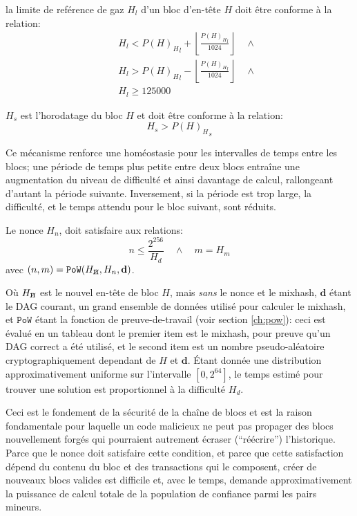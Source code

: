 \documentclass[9pt,oneside]{amsart}
\newcommand{\hcancel}[1]{%
    \tikz[baseline=(tocancel.base)]{
        \node[inner sep=0pt,outer sep=0pt] (tocancel) {#1};
        \draw[black] (tocancel.south west) -- (tocancel.north east);
    }%
}%
\begin{document}
\begin{multicols}{2}
la limite de reférence de gaz $H_l$ d'un bloc d'en-tête $H$ doit être conforme à la relation:
\begin{eqnarray}
& & H_l < {P(H)_H}_l + \left\lfloor\frac{{P(H)_H}_l}{1024}\right\rfloor \quad \wedge \\
& & H_l > {P(H)_H}_l - \left\lfloor\frac{{P(H)_H}_l}{1024}\right\rfloor \quad \wedge \\
& & H_l \geqslant 125000
\end{eqnarray}

$H_s$ est l'horodatage du bloc $H$ et doit être conforme à la relation:
\begin{equation}
H_s > {P(H)_H}_s
\end{equation}

Ce mécanisme renforce une homéostasie pour les intervalles de temps entre les blocs; une période de temps plus petite entre deux blocs entraîne une augmentation du niveau de difficulté et ainsi davantage de calcul, rallongeant d'autant la période suivante. Inversement, si la période est trop large, la difficulté, et le temps attendu pour le bloc suivant, sont réduits.

Le nonce $H_n$, doit satisfaire aux relations:
\begin{equation}
n \leqslant \frac{2^{256}}{H_d} \quad \wedge \quad m = H_m
\end{equation}
avec $(n, m) = \mathtt{PoW}(H_{\hcancel{n}}, H_n, \mathbf{d})$.

Où $H_{\hcancel{n}}$ est le nouvel en-tête de bloc $H$, mais \textit{sans} le nonce et le mixhash, $\mathbf{d}$ étant le DAG courant, un grand ensemble de données utilisé pour calculer le mixhash, et $\mathtt{PoW}$ étant la fonction de preuve-de-travail (voir section \ref{ch:pow}): ceci est évalué en un tableau dont le premier item est le mixhash, pour preuve qu'un DAG correct a été utilisé, et le second item est un nombre pseudo-aléatoire cryptographiquement dependant de $H$ et $\mathbf{d}$. Étant donnée une distribution approximativement uniforme sur l'intervalle $[0, 2^{64}]$, le temps estimé pour trouver une solution est proportionnel à la difficulté $H_d$.

Ceci est le fondement de la sécurité de la chaîne de blocs et est la raison fondamentale pour laquelle un code malicieux ne peut pas propager des blocs nouvellement forgés qui pourraient autrement écraser (``réécrire'') l'historique. Parce que le nonce doit satisfaire cette condition, et parce que cette satisfaction dépend du contenu du bloc et des transactions qui le composent, créer de nouveaux blocs valides est difficile et, avec le temps, demande  approximativement la puissance de calcul totale de la population de confiance parmi les pairs mineurs.


\end{multicols}
\end{document}
